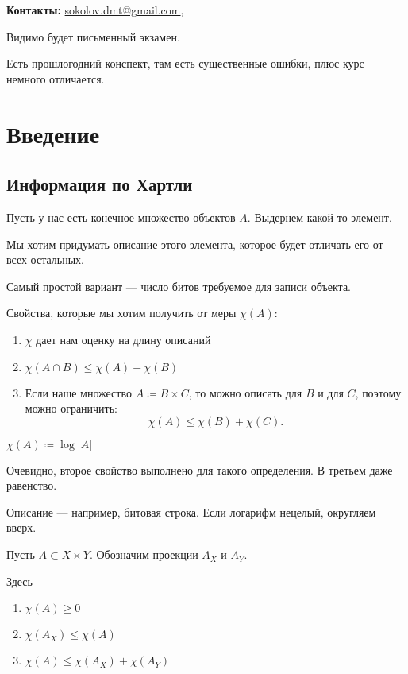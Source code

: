 \textbf{Контакты:} \url{sokolov.dmt@gmail.com}, 

Видимо будет письменный экзамен.

Есть прошлогодний конспект, там есть существенные ошибки, плюс курс немного отличается.

\chapter{Введение}
\section{Информация по Хартли}
Пусть у нас есть конечное множество объектов $ A$. Выдернем какой-то элемент.

Мы хотим придумать описание этого элемента, которое будет отличать его от всех остальных.

Самый простой вариант --- число битов требуемое для записи объекта.

Свойства, которые мы хотим получить от меры $ \chi(A)$:
\begin{enumerate}
    \item $ \chi$ дает нам оценку на длину описаний
	\item $ \chi(A \cap B) \le \chi(A) + \chi(B)$
	\item 
Если наше множество $ A \coloneqq  B \times C$, то можно описать для $ B$ и для  $ C$, поэтому можно ограничить:
\[
	\chi(A)  \le \chi(B) + \chi(C)
.\] 
\end{enumerate} 

\begin{defn}
	$ \chi(A) \coloneqq  \log \lvert A \rvert $
\end{defn}
\begin{note}
Очевидно, второе свойство выполнено для такого определения. В третьем даже равенство. 

Описание --- например, битовая строка. Если логарифм нецелый, округляем вверх.
\end{note}
Пусть $ A  \subset X \times Y$. Обозначим проекции $ A_X$ и $ A_{Y}$.
\begin{figure}[ht]
    \centering
    \label{fig:axy-img}
\end{figure}
Здесь 
\begin{enumerate}
	\item $ \chi(A) \ge 0$
	\item $ \chi(A_{X}) \le \chi(A)$
	\item $ \chi(A) \le \chi(A_{X}) + \chi(A_{Y})$
\end{enumerate} 


